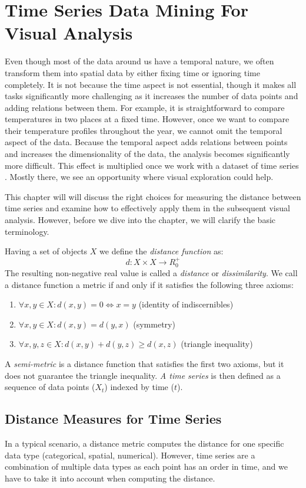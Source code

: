 \chapter{Time Series Data Mining For Visual Analysis}
Even though most of the data around us have a temporal nature, we often transform them into spatial data by either fixing time or ignoring time completely. It is not because the time aspect is not essential, though it makes all tasks significantly more challenging as it increases the number of data points and adding relations between them.  For example, it is straightforward to compare temperatures in two places at a fixed time. However, once we want to compare their temperature profiles throughout the year, we cannot omit the temporal aspect of the data. Because the temporal aspect adds relations between points and increases the dimensionality of the data, the analysis becomes significantly more difficult. This effect is multiplied once we work with a dataset of time series \cite{met:vis-data-help}. Mostly there, we see an opportunity where visual exploration could help.

This chapter will will discuss the right choices for measuring the distance between time series and examine how to effectively apply them in the subsequent visual analysis. However, before we dive into the chapter, we will clarify the basic terminology.

Having a set of objects $X$ we define the \textit{distance function} as:
\begin{equation}
    d: X \times X \rightarrow R^{+}_0 
\end{equation}
The resulting non-negative real value is called a \textit{distance} or \textit{dissimilarity}. We call a distance function a metric if and only if it satisfies the following three axioms:
\begin{enumerate}
    \item $\forall x, y \in X: d(x, y) = 0 \Leftrightarrow x = y $ (identity of indiscernibles)
    \item $\forall x, y \in X: d(x, y) = d(y, x)$ (symmetry)
    \item $\forall x, y, z \in X: d(x, y) + d(y, z) \ge d(x, z)$ (triangle inequality)
\end{enumerate}
A \textit{semi-metric} is a distance function that satisfies the first two axioms, but it does not guarantee the triangle inequality.
\textit{A time series} is then defined as a sequence of data points ($X_t$) indexed by time ($t$).

\section{Distance Measures for Time Series}
In a typical scenario, a distance metric computes the distance for one specific data type (categorical, spatial, numerical). However, time series are a combination of multiple data types as each point has an order in time, and we have to take it into account when computing the distance.

